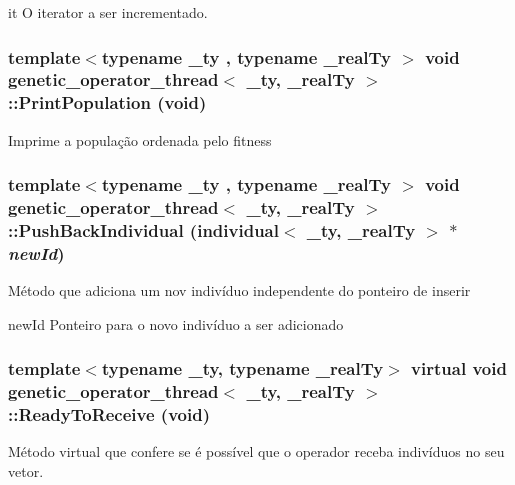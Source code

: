 it O iterator a ser incrementado. \hypertarget{classgenetic__operator__thread_afaab02a61f5f0a52b37c4f8bda8df131}{
\subsubsection[{PrintPopulation}]{\setlength{\rightskip}{0pt plus 5cm}template$<$typename \_\-ty , typename \_\-realTy $>$ void {\bf genetic\_\-operator\_\-thread}$<$ \_\-ty, \_\-realTy $>$::PrintPopulation (void)}}
\label{classgenetic__operator__thread_afaab02a61f5f0a52b37c4f8bda8df131}
Imprime a população ordenada pelo fitness \hypertarget{classgenetic__operator__thread_a1e355fe496238b6433bbf9f3f70bf6ad}{
\subsubsection[{PushBackIndividual}]{\setlength{\rightskip}{0pt plus 5cm}template$<$typename \_\-ty , typename \_\-realTy $>$ void {\bf genetic\_\-operator\_\-thread}$<$ \_\-ty, \_\-realTy $>$::PushBackIndividual ({\bf individual}$<$ \_\-ty, \_\-realTy $>$ $\ast$ {\em newId})}}
\label{classgenetic__operator__thread_a1e355fe496238b6433bbf9f3f70bf6ad}
Método que adiciona um nov indivíduo independente do ponteiro de inserir

newId Ponteiro para o novo indivíduo a ser adicionado \hypertarget{classgenetic__operator__thread_a7c86cee81334320d496fb196920fcc10}{
\subsubsection[{ReadyToReceive}]{\setlength{\rightskip}{0pt plus 5cm}template$<$typename \_\-ty, typename \_\-realTy$>$ virtual void {\bf genetic\_\-operator\_\-thread}$<$ \_\-ty, \_\-realTy $>$::ReadyToReceive (void)}}
\label{classgenetic__operator__thread_a7c86cee81334320d496fb196920fcc10}
Método virtual que confere se é possível que o operador receba indivíduos no seu vetor. 

